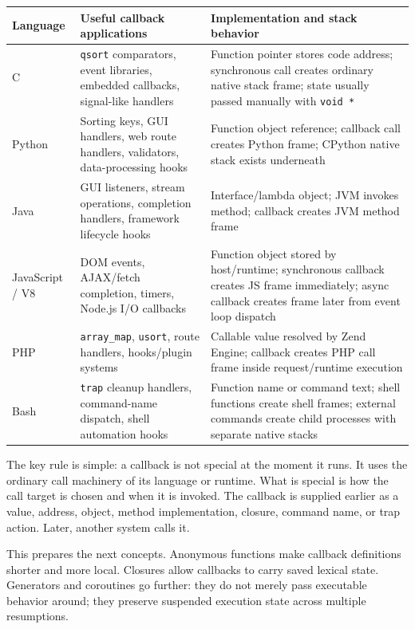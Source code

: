 \begin{center}
\begin{tabular}{|p{}|p{}|p{}|}
\hline
\textbf{Language} & \textbf{Useful callback applications} & \textbf{Implementation and stack behavior} \\
\hline
C & \texttt{qsort} comparators, event libraries, embedded callbacks, signal-like handlers & Function pointer stores code address; synchronous call creates ordinary native stack frame; state usually passed manually with \texttt{void *} \\
\hline
Python & Sorting keys, GUI handlers, web route handlers, validators, data-processing hooks & Function object reference; callback call creates Python frame; CPython native stack exists underneath \\
\hline
Java & GUI listeners, stream operations, completion handlers, framework lifecycle hooks & Interface/lambda object; JVM invokes method; callback creates JVM method frame \\
\hline
JavaScript / V8 & DOM events, AJAX/fetch completion, timers, Node.js I/O callbacks & Function object stored by host/runtime; synchronous callback creates JS frame immediately; async callback creates frame later from event loop dispatch \\
\hline
PHP & \texttt{array\_map}, \texttt{usort}, route handlers, hooks/plugin systems & Callable value resolved by Zend Engine; callback creates PHP call frame inside request/runtime execution \\
\hline
Bash & \texttt{trap} cleanup handlers, command-name dispatch, shell automation hooks & Function name or command text; shell functions create shell frames; external commands create child processes with separate native stacks \\
\hline
\end{tabular}
\end{center}

The key rule is simple: a callback is not special at the moment it runs. It uses the ordinary call machinery of its language or runtime. What is special is how the call target is chosen and when it is invoked. The callback is supplied earlier as a value, address, object, method implementation, closure, command name, or trap action. Later, another system calls it.

This prepares the next concepts. Anonymous functions make callback definitions shorter and more local. Closures allow callbacks to carry saved lexical state. Generators and coroutines go further: they do not merely pass executable behavior around; they preserve suspended execution state across multiple resumptions.



